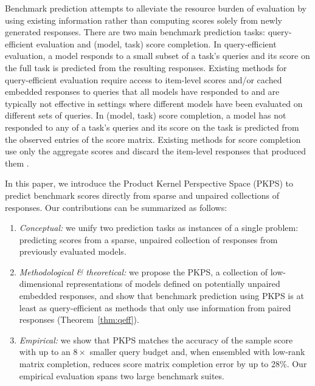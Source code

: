 \documentclass{article}
\theoremstyle{definition}
\theoremstyle{plain}
\newcommand{\PKPS}{PKPS\xspace}
\begin{document}
Benchmark prediction
attempts to alleviate the resource burden of evaluation by using existing information rather than computing scores solely from newly generated
responses.
There are two main benchmark prediction tasks: query-efficient evaluation and
(model, task) score completion.
In query-efficient evaluation, a model responds to a small subset of a task's queries
and its score on the full task is predicted from the resulting responses.
Existing methods for query-efficient evaluation require access to item-level scores \citep{polo2024tinybenchmarks, hofmann2025fluid, li2024active,
bowyer2026efficient} and/or cached embedded responses \citep{dkps_qeff} to queries that all models have responded to and are typically not effective in settings where different models have been evaluated on different sets of queries.
In (model, task) score completion, a model has not responded to any of a task's
queries and its score on the task is predicted from the observed entries of the score
matrix.
Existing methods for score completion use only the aggregate scores and discard the
item-level responses that produced them \citep{benchpress}.

In this paper, we introduce the Product Kernel Perspective Space (\PKPS) to predict
benchmark scores directly from sparse and unpaired collections of responses.
Our contributions can be summarized as follows:
\begin{enumerate}
[wide, labelwidth=1pt, labelindent=12pt]
\setlength{\itemsep}{1pt}\setlength{\parskip}{0pt}
\item \emph{Conceptual:} we unify two prediction
tasks as instances
of a single problem: predicting scores from a sparse, unpaired collection of
responses from previously evaluated models.
\item \emph{Methodological \& theoretical:} we propose the \PKPS, a collection of
low-dimensional representations of models defined on potentially unpaired embedded
responses, and show that benchmark prediction using \PKPS is at least as
query-efficient as methods that only use information from paired responses
(Theorem~\ref{thm:qeff}).
\item \emph{Empirical:} we show
that \PKPS matches the accuracy of the sample score with up to an $8\times$ smaller
query budget and, when ensembled with low-rank matrix completion, reduces score
matrix completion error by up to 28\%. Our empirical evaluation spans two large benchmark suites. 
\end{enumerate}
\end{document}
